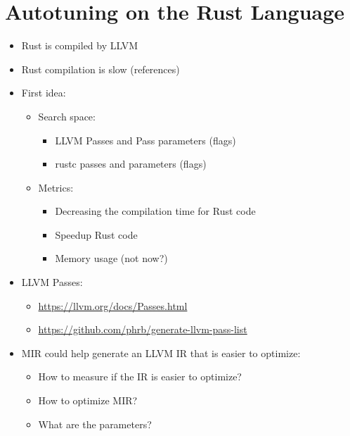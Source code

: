 \documentclass[11pt]{article}
\date{\today}
\title{}
\begin{document}
\section{Autotuning on the Rust Language}
\label{sec:org4b76b4a}
\begin{itemize}
\item Rust is compiled by LLVM
\item Rust compilation is slow (references)
\item First idea:
\begin{itemize}
\item Search space:
\begin{itemize}
\item LLVM Passes and Pass parameters (flags)
\item rustc passes and parameters (flags)
\end{itemize}
\item Metrics:
\begin{itemize}
\item Decreasing the compilation time for Rust code
\item Speedup Rust code
\item Memory usage (not now?)
\end{itemize}
\end{itemize}
\item LLVM Passes:
\begin{itemize}
\item \url{https://llvm.org/docs/Passes.html}
\item \url{https://github.com/phrb/generate-llvm-pass-list}
\end{itemize}
\item MIR could help generate an LLVM IR that is easier to optimize:
\begin{itemize}
\item How to measure if the IR is easier to optimize?
\item How to optimize MIR?
\item What are the parameters?
\end{itemize}
\end{itemize}
\end{document}

